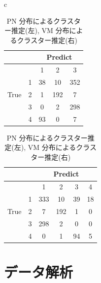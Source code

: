\documentclass[a4paper,11pt]{jarticle}
\begin{document}
\begin{table}[H]
\caption{PN 分布によるクラスター推定(左), VM 分布によるクラスター推定(右)}
\begin{tabular}{c}
\hspace{1.5cm}
\begin{minipage}{0.5\hsize}
\begin{center}
\begin{tabular}{|c|c|c|c|c|}
\hline
 &  & \multicolumn{3}{|c|}{Predict} \\ \hline
 &  & 1 & 2 & 3 \\ \hline 
 &1 & 38 & 10 & 352 \\ \cline{2-5}
True
 & 2 & 1 & 192 & 7 \\ \cline{2-5}
 & 3 & 0 & 2  & 298 \\ \cline{2-5}
 & 4 & 93 & 0 & 7 \\ 
\hline
 \end{tabular}
 \end{center}
\end{minipage}

\hspace{-2.5cm}
\begin{minipage}{0.5\hsize}
\begin{center}
\begin{tabular}{|c|c|c|c|c|c|}
\hline
 &  & \multicolumn{4}{|c|}{Predict} \\ \hline
 &  & 1 & 2 & 3 & 4 \\ \hline 
 & 1 & 333 & 10 & 39 & 18 \\ \cline{2-6}
True
 & 2 & 7 & 192 & 1 & 0 \\ \cline{2-6}
 & 3 & 298 & 2  & 0 & 0 \\ \cline{2-6}
 & 4 & 0 & 1 & 94 & 5 \\ 
\hline
\end{tabular}
\end{center}
\end{minipage}

\end{tabular}
\end{table}
\fi

\section{データ解析}
\end{document}
